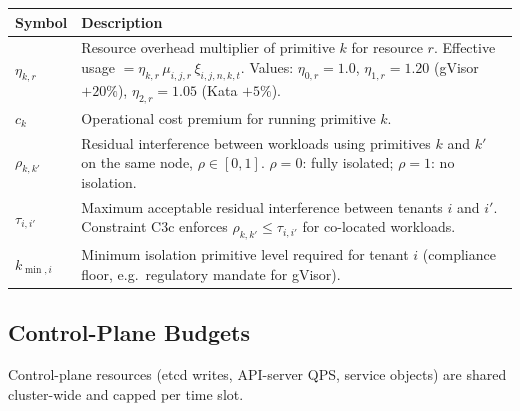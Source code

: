 \documentclass[11pt,a4paper]{article}
\begin{document}
\begin{longtable}{@{}p{2.2cm}p{11.5cm}@{}}
  \toprule
  \textbf{Symbol} & \textbf{Description} \\
  \midrule
  \endhead
  $\eta_{k,r}$        & Resource overhead multiplier of primitive $k$ for resource
                         $r$.  Effective usage $= \eta_{k,r}\,\mu_{i,j,r}\,\xi_{i,j,n,k,t}$.
                         Values: $\eta_{0,r}=1.0$, $\eta_{1,r}=1.20$ (gVisor $+20\%$),
                         $\eta_{2,r}=1.05$ (Kata $+5\%$). \\[4pt]
  $c_k$               & Operational cost premium for running primitive $k$. \\[4pt]
  $\rho_{k,k'}$       & Residual interference between workloads using primitives $k$
                         and $k'$ on the same node, $\rho\in[0,1]$.
                         $\rho=0$: fully isolated; $\rho=1$: no isolation. \\[4pt]
  $\tau_{i,i'}$       & Maximum acceptable residual interference between tenants
                         $i$ and $i'$.  Constraint C3c enforces
                         $\rho_{k,k'}\le\tau_{i,i'}$ for co-located workloads. \\[4pt]
  $k_{\min,i}$        & Minimum isolation primitive level required for tenant $i$
                         (compliance floor, e.g.\ regulatory mandate for gVisor). \\
  \bottomrule
\end{longtable}

\subsection{Control-Plane Budgets}

Control-plane resources (etcd writes, API-server QPS, service objects) are
shared cluster-wide and capped per time slot.
\end{document}
